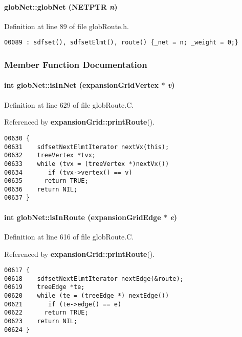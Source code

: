 \paragraph{\setlength{\rightskip}{0pt plus 5cm}glob\-Net::glob\-Net (NETPTR {\em n})}\hfill



Definition at line 89 of file glob\-Route.h.\small\begin{verbatim}00089 : sdfset(), sdfsetElmt(), route() {_net = n; _weight = 0;}
\end{verbatim}\normalsize 


\subsubsection{Member Function Documentation}
\label{globNet_a6}
\paragraph{\setlength{\rightskip}{0pt plus 5cm}int glob\-Net::is\-In\-Net ({\bf expansion\-Grid\-Vertex} $\ast$ {\em v})}\hfill



Definition at line 629 of file glob\-Route.C.

Referenced by {\bf expansion\-Grid::print\-Route}().\small\begin{verbatim}00630 {
00631    sdfsetNextElmtIterator nextVx(this);
00632    treeVertex *tvx;
00633    while (tvx = (treeVertex *)nextVx())
00634       if (tvx->vertex() == v)
00635      return TRUE;
00636    return NIL;
00637 }
\end{verbatim}\normalsize 
\label{globNet_a5}
\paragraph{\setlength{\rightskip}{0pt plus 5cm}int glob\-Net::is\-In\-Route ({\bf expansion\-Grid\-Edge} $\ast$ {\em e})}\hfill



Definition at line 616 of file glob\-Route.C.

Referenced by {\bf expansion\-Grid::print\-Route}().\small\begin{verbatim}00617 {
00618    sdfsetNextElmtIterator nextEdge(&route);
00619    treeEdge *te;
00620    while (te = (treeEdge *) nextEdge())
00621       if (te->edge() == e)
00622      return TRUE;
00623    return NIL;
00624 }
\end{verbatim}\normalsize 
\label{globNet_a1}
